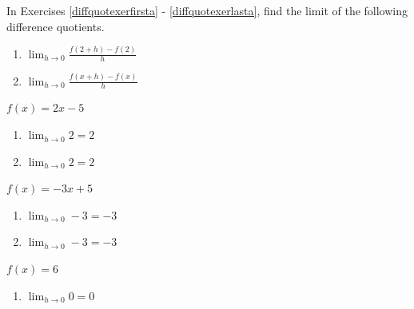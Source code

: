 \documentclass{ximera}
\begin{document}
	\author{Stitz-Zeager}


\label{ExercisesforIntroductiontoDerivatives}

\begin{question}
In Exercises \ref{diffquotexerfirsta} - \ref{diffquotexerlasta}, find the limit of the following difference quotients.


\begin{enumerate}

\item  $\lim_{h \rightarrow 0} \frac{f(2+h) - f(2)}{h}$

\item  $\lim_{h \rightarrow 0} \frac{f(x+h) - f(x)}{h}$

\end{enumerate}

\begin{problem} \label{diffquotexerfirsta}
$f(x) = 2x - 5$ 

\begin{solution}

\begin{enumerate}
\item $\lim_{h \rightarrow 0} 2 = 2$

\item $\lim_{h \rightarrow 0} 2 = 2$
\end{enumerate}
\end{solution}
\end{problem}

\begin{problem}
$f(x) = -3x + 5$

\begin{solution}
\begin{enumerate}
\item $\lim_{h \rightarrow 0} -3 = -3$

\item $\lim_{h \rightarrow 0} -3 = -3$
\end{enumerate}
\end{solution}
\end{problem}

\begin{problem}
$f(x) = 6$

\begin{solution}
\begin{enumerate}
\item $\lim_{h \rightarrow 0} 0 = 0$


\end{enumerate}
\end{solution}
\end{problem}
\end{question}
\end{document}

